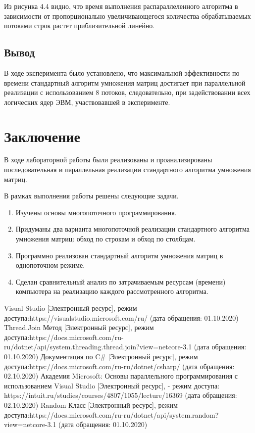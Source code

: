 \documentclass[12pt]{report}
\begin{document}
Из рисунка 4.4 видно, что время выполнения распараллеленного алгоритма в зависимости от пропорционально увеличивающегося количества обрабатываемых потоками строк растет приблизительной линейно.

\section{Вывод}

В ходе эксперимента было установлено, что максимальной эффективности по времени стандартный алгоритм умножения матриц достигает при параллельной реализации с использованием 8 потоков, следовательно, при задействовании всех логических ядер ЭВМ, участвовавшей в эксперименте.


\chapter*{Заключение}
В ходе лабораторной работы были реализованы и проанализированы последовательная и параллельная реализации стандартного алгоритма умножения матриц. 

В рамках выполнения работы решены следующие задачи.

\begin{enumerate}
\item Изучены основы многопоточного программирования.
\item  Придуманы два варианта многопоточной реализации стандартного алгоритма умножения матриц: обход по строкам и обход по столбцам.
\item Программно реализован стандартный алгоритм умножения матриц в однопоточном режиме.
\item Сделан сравнительный анализ по затрачиваемым ресурсам (времени) компьютера на реализацию каждого рассмотренного алгоритма.
\end{enumerate}

%
%


\begin{thebibliography}{3}
	Visual Studio [Электронный ресурс], режим доступа:https://visualstudio.microsoft.com/ru/ (дата обращения: 01.10.2020)
	Thread.Join Метод [Электронный ресурс], режим доступа:https://docs.microsoft.com/ru-ru/dotnet/api/system.threading.thread.join?view=netcore-3.1 (дата обращения: 01.10.2020)
	Документация по C\# [Электронный ресурс], режим доступа:https://docs.microsoft.com/ru-ru/dotnet/csharp/ (дата обращения: 02.10.2020)
	Академия Microsoft: Основы параллельного программирования с использованием Visual Studio [Электронный ресурс], - режим доступа: https://intuit.ru/studies/courses/4807/1055/lecture/16369 (дата обращения: 02.10.2020)
	Random Класс [Электронный ресурс], режим доступа:https://docs.microsoft.com/ru-ru/dotnet/api/system.random?view=netcore-3.1 (дата обращения: 01.10.2020)
\end{thebibliography}
\end{document}
